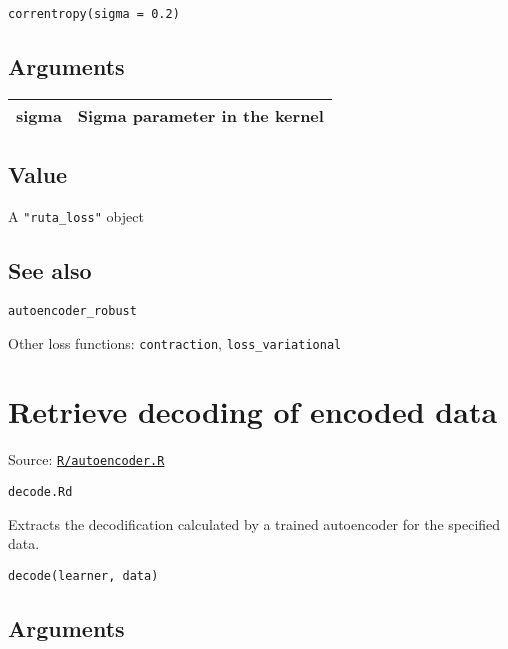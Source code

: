 \begin{verbatim}
correntropy(sigma = 0.2)
\end{verbatim}

\hypertarget{arguments}{\subsection{\texorpdfstring{\protect\hyperlink{arguments}{}Arguments}{Arguments}}\label{arguments}}

\begin{longtable}[c]{@{}ll@{}}
\toprule
sigma & Sigma parameter in the kernel\tabularnewline
\bottomrule
\end{longtable}

\hypertarget{value}{\subsection{\texorpdfstring{\protect\hyperlink{value}{}Value}{Value}}\label{value}}

A \texttt{"ruta\_loss"} object

\hypertarget{see-also}{\subsection{\texorpdfstring{\protect\hyperlink{see-also}{}See
also}{See also}}\label{see-also}}

\texttt{autoencoder\_robust}

Other loss functions: \texttt{contraction}, \texttt{loss\_variational}

\section{Retrieve decoding of encoded
data}\label{retrieve-decoding-of-encoded-data}

Source:
\href{https://github.com/fdavidcl/ruta/blob/master/R/autoencoder.R}{\texttt{R/autoencoder.R}}

\texttt{decode.Rd}

Extracts the decodification calculated by a trained autoencoder for the
specified data.

\begin{verbatim}
decode(learner, data)
\end{verbatim}

\hypertarget{arguments}{\subsection{\texorpdfstring{\protect\hyperlink{arguments}{}Arguments}{Arguments}}\label{arguments}}

